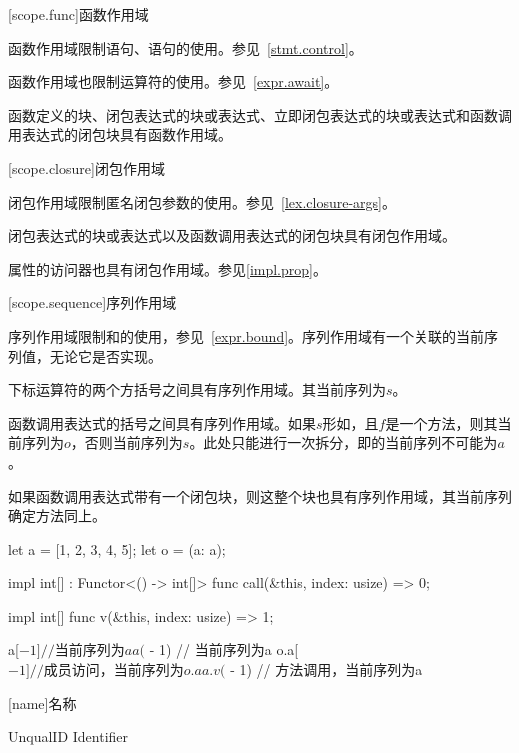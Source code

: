 [scope.func]{函数作用域}

\pnum
函数作用域限制语句、语句的使用。参见~\ref{stmt.control}。

\pnum
函数作用域也限制运算符的使用。参见~\ref{expr.await}。

\pnum
函数定义的块、闭包表达式的块或表达式、立即闭包表达式的块或表达式和函数调用表达式的闭包块具有函数作用域。

[scope.closure]{闭包作用域}

\pnum
闭包作用域限制匿名闭包参数的使用。参见~\ref{lex.closure-args}。

\pnum
闭包表达式的块或表达式以及函数调用表达式的闭包块具有闭包作用域。

\pnum
属性的访问器也具有闭包作用域。参见\ref{impl.prop}。

[scope.sequence]{序列作用域}

\pnum
序列作用域限制\tcode{\textasciicircum}和\tcode{\$}的使用，参见~\ref{expr.bound}。序列作用域有一个关联的当前序列值，无论它是否实现。

\pnum
下标运算符的两个方括号之间具有序列作用域。其当前序列为$s$。

\pnum
函数调用表达式的括号之间具有序列作用域。如果$s$形如，且$f$是一个方法，则其当前序列为$o$，否则当前序列为$s$。\enternote 此处只能进行一次拆分，即的当前序列不可能为$a$。\exitnote

\pnum
如果函数调用表达式带有一个闭包块，则这整个块也具有序列作用域，其当前序列确定方法同上。

\enterexample

\begin{codeblock}
let a = [1, 2, 3, 4, 5];
let o = (a: a);

impl int[] : Functor<() -> int[]> {
    func call(&this, index: usize) => 0;
}

impl int[] {
    func v(&this, index: usize) => 1;
}

a[$ - 1] // 当前序列为a
a($ - 1) // 当前序列为a
o.a[$ - 1] // 成员访问，当前序列为o.a
a.v($ - 1) // 方法调用，当前序列为a

\end{codeblock}

\exitexample

[name]{名称}

\begin{bnf}{UnqualID}
    Identifier \br
\end{bnf}

